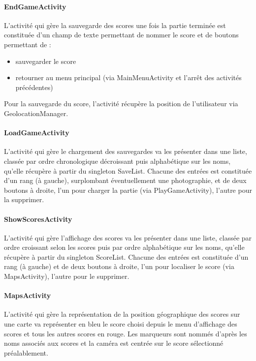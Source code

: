 \documentclass{article}
\begin{document}
\paragraph{EndGameActivity}
L’activité qui gère la sauvegarde des scores une fois la partie terminée est constituée d’un champ de texte permettant de nommer le score et de boutons permettant de :
\begin{itemize}
\item sauvegarder le score
\item retourner au menu principal (via MainMenuActivity et l’arrêt des activités précédentes)
\end{itemize}
Pour la sauvegarde du score, l'activité récupère la position de l’utilisateur via GeolocationManager.

\paragraph{LoadGameActivity}
L’activité qui gère le chargement des sauvegardes va les présenter dans une liste, classée par ordre chronologique décroissant puis alphabétique sur les noms, qu'elle récupère à partir du singleton SaveList. Chacune des entrées est constituée d’un rang (à gauche), surplombant éventuellement une photographie, et de deux boutons à droite, l’un pour charger la partie (via PlayGameActivity), l’autre pour la supprimer.

\paragraph{ShowScoresActivity}
L’activité qui gère l’affichage des scores va les présenter dans une liste, classée par ordre croissant selon les scores puis par ordre alphabétique sur les noms, qu'elle récupère à partir du singleton ScoreList. Chacune des entrées est constituée d’un rang (à gauche) et de deux boutons à droite, l’un pour localiser le score (via MapsActivity), l’autre pour le supprimer.

\paragraph{MapsActivity}
L’activité qui gère la représentation de la position géographique des scores sur une carte va représenter en bleu le score choisi depuis le menu d’affichage des scores et tous les autres scores en rouge. Les marqueurs sont nommés d'après les noms associés aux scores et la caméra est centrée sur le score sélectionné préalablement.
\end{document}
